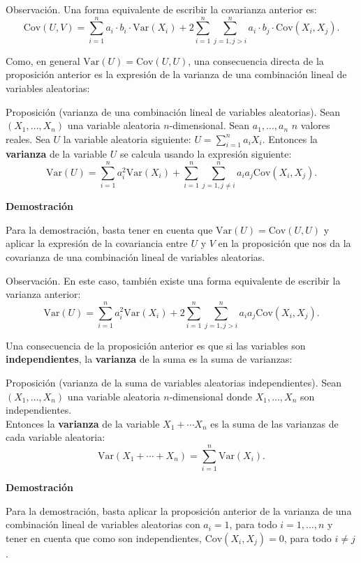 \documentclass[
  letterpaper,
  DIV=11,
  numbers=noendperiod]{scrreprt}
\begin{document}
Observación. Una forma equivalente de escribir la covarianza anterior
es: \[
\mathrm{Cov}(U,V)=\sum_{i=1}^n a_i\cdot  b_i\cdot  \mathrm{Var}(X_i)+2\sum_{i=1}^n\sum_{j=1,j>i}^n a_i\cdot  b_j\cdot  \mathrm{Cov}(X_i,X_j).
\]

Como, en general \(\mathrm{Var}(U)=\mathrm{Cov}(U,U)\), una consecuencia
directa de la proposición anterior es la expresión de la varianza de una
combinación lineal de variables aleatorias:

Proposición (varianza de una combinación lineal de variables
aleatorias). Sean \((X_1,\ldots,X_n)\) una variable aleatoria
\(n\)-dimensional. Sean \(a_1, \ldots, a_n\) \(n\) valores reales. Sea
\(U\) la variable aleatoria siguiente:
\(U=\sum\limits_{i=1}^n a_i X_i.\) Entonces la \textbf{varianza} de la
variable \(U\) se calcula usando la expresión siguiente: \[
\mathrm{Var}(U)=\sum_{i=1}^n a_i^2 \mathrm{Var}(X_i)+\sum_{i=1}^n\sum_{j=1,j\neq i}^n a_i a_j \mathrm{Cov}(X_i,X_j).
\]

\textbf{Demostración}

Para la demostración, basta tener en cuenta que
\(\mathrm{Var}(U)=\mathrm{Cov}(U,U)\) y aplicar la expresión de la
covariancia entre \(U\) y \(V\) en la proposición que nos da la
covarianza de una combinación lineal de variables aleatorias.

Observación. En este caso, también existe una forma equivalente de
escribir la varianza anterior: \[
\mathrm{Var}(U)=\sum_{i=1}^n a_i^2 \mathrm{Var}(X_i)+2\sum_{i=1}^n\sum_{j=1,j>i}^n a_i a_j \mathrm{Cov}(X_i,X_j).
\]

Una consecuencia de la proposición anterior es que si las variables son
\textbf{independientes}, la \textbf{varianza} de la suma es la suma de
varianzas:

Proposición (varianza de la suma de variables aleatorias
independientes). Sean \((X_1,\ldots,X_n)\) una variable aleatoria
\(n\)-dimensional donde \(X_1,\ldots, X_n\) son independientes.\\
Entonces la \textbf{varianza} de la variable \(X_1+\cdots X_n\) es la
suma de las varianzas de cada variable aleatoria: \[
\mathrm{Var}(X_1+\cdots + X_n)=\sum_{i=1}^n \mathrm{Var}(X_i).
\]

\textbf{Demostración}

Para la demostración, basta aplicar la proposición anterior de la
varianza de una combinación lineal de variables aleatorias con
\(a_i=1\), para todo \(i=1,\ldots,n\) y tener en cuenta que como son
independientes, \(\mathrm{Cov}(X_i,X_j)=0\), para todo \(i\neq j\).
\end{document}
